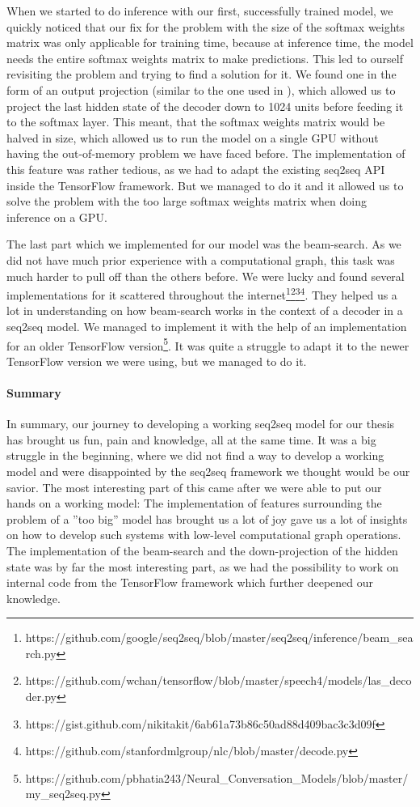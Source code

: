 When we started to do inference with our first, successfully trained model, we quickly noticed that our fix for the problem with the size of the softmax weights matrix was only applicable for training time, because at inference time, the model needs the entire softmax weights matrix to make predictions. This led to ourself revisiting the problem and trying to find a solution for it. We found one in the form of an output projection (similar to the one used in \cite{Vinyals:2015}), which allowed us to project the last hidden state of the decoder down to 1024 units before feeding it to the softmax layer. This meant, that the softmax weights matrix would be halved in size, which allowed us to run the model on a single GPU without having the out-of-memory problem we have faced before. The implementation of this feature was rather tedious, as we had to adapt the existing seq2seq API inside the TensorFlow framework. But we managed to do it and it allowed us to solve the problem with the too large softmax weights matrix when doing inference on a GPU.

The last part which we implemented for our model was the beam-search. As we did not have much prior experience with a computational graph, this task was much harder to pull off than the others before. We were lucky and found several implementations for it scattered throughout the internet\footnote{https://github.com/google/seq2seq/blob/master/seq2seq/inference/beam\_search.py}\footnote{https://github.com/wchan/tensorflow/blob/master/speech4/models/las\_decoder.py}\footnote{https://gist.github.com/nikitakit/6ab61a73b86c50ad88d409bac3c3d09f}\footnote{https://github.com/stanfordmlgroup/nlc/blob/master/decode.py}. They helped us a lot in understanding on how beam-search works in the context of a decoder in a seq2seq model. We managed to implement it with the help of an implementation for an older TensorFlow version\footnote{https://github.com/pbhatia243/Neural\_Conversation\_Models/blob/master/my\_seq2seq.py}. It was quite a struggle to adapt it to the newer TensorFlow version we were using, but we managed to do it.

\paragraph{Summary} In summary, our journey to developing a working seq2seq model for our thesis has brought us fun, pain and knowledge, all at the same time. It was a big struggle in the beginning, where we did not find a way to develop a working model and were disappointed by the seq2seq framework we thought would be our savior. The most interesting part of this came after we were able to put our hands on a working model: The implementation of features surrounding the problem of a ''too big'' model has brought us a lot of joy gave us a lot of insights on how to develop such systems with low-level computational graph operations. The implementation of the beam-search and the down-projection of the hidden state was by far the most interesting part, as we had the possibility to work on internal code from the TensorFlow framework which further deepened our knowledge.

